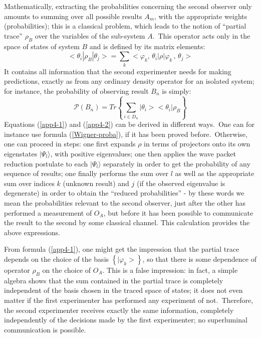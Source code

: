 \documentclass[12pt,onecolumn]{article}%
\begin{document}
Mathematically, extracting the probabilities concerning the second observer
only amounts to summing over all possible results $A_{m}$, with the
appropriate weights (probabilities); this is a classical problem, which leads
to the notion of ``partial trace'' $\rho_{B}$ over the variables of the
sub-system $A$.\ This operator acts only in the space of states of system $B$
and is defined by its matrix elements:%
\begin{equation}
<\theta_{i}|\rho_{B}|\theta_{j}>=\sum_{k}<\varphi_{k},\,\theta_{i}%
|\rho|\varphi_{k}\,,\,\theta_{j}> \label{app4-1}%
\end{equation}
It contains all information that the second experimenter needs for making
predictions, exactly as from any ordinary density operator for an isolated
system; for instance, the probability of observing result $B_{n}$ is simply:%
\begin{equation}
\mathcal{P}(B_{n})=Tr\left\{  \sum_{i\in D_{n}}|\theta_{i}><\theta_{i}%
|\rho_{B}\right\}  \label{app4-2}%
\end{equation}
Equations (\ref{app4-1}) and (\ref{app4-2}) can be derived in different
ways.\ One can for instance use formula (\ref{Wigner-proba}), if it has been
proved before.\ Otherwise, one can proceed in steps: one first expands $\rho$
in terms of projectors onto its own eigenstates $|\Psi_{l}\rangle$, with positive
eigenvalues; one then applies the wave packet reduction postulate to each
$|\Psi_{l}\rangle$ separately in order to get the probability of any sequence of
results; one finally performs the sum over $l$ as well as the appropriate sum
over indices $k$ (unknown result) and $j$ (if the observed eigenvalue is
degenerate) in order to obtain the ``reduced probabilities'' - by these words
we mean the probabilities relevant to the second observer, just after the
other has performed a measurement of $O_{A}$, but before it has been possible
to communicate the result to the second by some classical channel. This
calculation provides the above expressions.

From formula (\ref{app4-1}), one might get the impression that the partial
trace depends on the choice of the basis $\left\{  |\varphi_{k}>\right\}
$, so that there is some dependence of operator $\rho_{B}$ on the choice of
$O_{A}$. This is a false impression: in fact, a simple algebra shows that the
sum contained in the partial trace is completely independent of the basis
chosen in the traced space of states; it does not even matter if the first
experimenter has performed any experiment of not.\ Therefore, the second
experimenter receives exactly the same information, completely independently
of the decisions made by the first experimenter; no superluminal communication
is possible.
\end{document}
